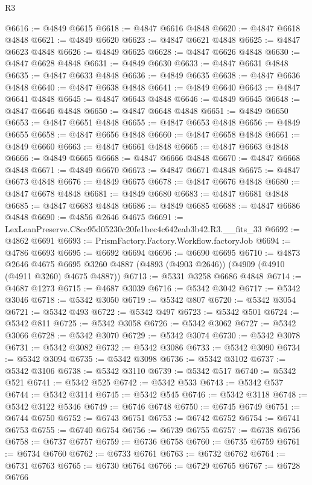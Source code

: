 \begin{lexlean}{R3}
\begin{coremodule}
@6616 := @4849 @6615
@6618 := @4847 @6616 @4848
@6620 := @4847 @6618 @4848
@6621 := @4849 @6620
@6623 := @4847 @6621 @4848
@6625 := @4847 @6623 @4848
@6626 := @4849 @6625
@6628 := @4847 @6626 @4848
@6630 := @4847 @6628 @4848
@6631 := @4849 @6630
@6633 := @4847 @6631 @4848
@6635 := @4847 @6633 @4848
@6636 := @4849 @6635
@6638 := @4847 @6636 @4848
@6640 := @4847 @6638 @4848
@6641 := @4849 @6640
@6643 := @4847 @6641 @4848
@6645 := @4847 @6643 @4848
@6646 := @4849 @6645
@6648 := @4847 @6646 @4848
@6650 := @4847 @6648 @4848
@6651 := @4849 @6650
@6653 := @4847 @6651 @4848
@6655 := @4847 @6653 @4848
@6656 := @4849 @6655
@6658 := @4847 @6656 @4848
@6660 := @4847 @6658 @4848
@6661 := @4849 @6660
@6663 := @4847 @6661 @4848
@6665 := @4847 @6663 @4848
@6666 := @4849 @6665
@6668 := @4847 @6666 @4848
@6670 := @4847 @6668 @4848
@6671 := @4849 @6670
@6673 := @4847 @6671 @4848
@6675 := @4847 @6673 @4848
@6676 := @4849 @6675
@6678 := @4847 @6676 @4848
@6680 := @4847 @6678 @4848
@6681 := @4849 @6680
@6683 := @4847 @6681 @4848
@6685 := @4847 @6683 @4848
@6686 := @4849 @6685
@6688 := @4847 @6686 @4848
@6690 := @4856 @2646 @4675
@6691 := LexLeanPreserve.C8ce95d05230c20fe1bec4c642eab3b42.R3.__fits_33
@6692 := @4862 @6691
@6693 := PrismFactory.Factory.Workflow.factoryJob
@6694 := @4786 @6693
@6695 := @6692 @6694
@6696 := @6690 @6695
@6710 := @4873
    @2646
    @4675
    @6695
    @3260
    @4887
    (@4893 (@4903 @2646))
    (@4909 (@4910 (@4911 @3260) @4675 @4887))
@6713 := @5331 @3258 @6686 @4848
@6714 := @4687 @1273
@6715 := @4687 @3039
@6716 := @5342 @3042
@6717 := @5342 @3046
@6718 := @5342 @3050
@6719 := @5342 @807
@6720 := @5342 @3054
@6721 := @5342 @493
@6722 := @5342 @497
@6723 := @5342 @501
@6724 := @5342 @811
@6725 := @5342 @3058
@6726 := @5342 @3062
@6727 := @5342 @3066
@6728 := @5342 @3070
@6729 := @5342 @3074
@6730 := @5342 @3078
@6731 := @5342 @3082
@6732 := @5342 @3086
@6733 := @5342 @3090
@6734 := @5342 @3094
@6735 := @5342 @3098
@6736 := @5342 @3102
@6737 := @5342 @3106
@6738 := @5342 @3110
@6739 := @5342 @517
@6740 := @5342 @521
@6741 := @5342 @525
@6742 := @5342 @533
@6743 := @5342 @537
@6744 := @5342 @3114
@6745 := @5342 @545
@6746 := @5342 @3118
@6748 := @5342 @3122 @5346
@6749 := @6746 @6748
@6750 := @6745 @6749
@6751 := @6744 @6750
@6752 := @6743 @6751
@6753 := @6742 @6752
@6754 := @6741 @6753
@6755 := @6740 @6754
@6756 := @6739 @6755
@6757 := @6738 @6756
@6758 := @6737 @6757
@6759 := @6736 @6758
@6760 := @6735 @6759
@6761 := @6734 @6760
@6762 := @6733 @6761
@6763 := @6732 @6762
@6764 := @6731 @6763
@6765 := @6730 @6764
@6766 := @6729 @6765
@6767 := @6728 @6766

\end{coremodule}
\end{lexlean}
